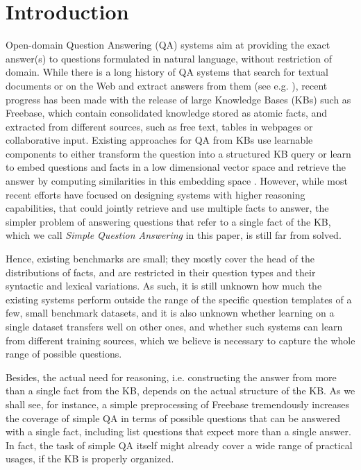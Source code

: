 \documentclass[11pt,a4paper]{article}
\newcommand{\fb}{{\sf Freebase}\xspace}
\begin{document}
\section{Introduction}

Open-domain Question Answering (QA) systems aim at providing the exact
answer(s) to questions formulated in natural language, without
restriction of domain. While there is a long history of QA systems
that search for textual documents or on the Web and extract answers
from them (see e.g. \cite{voorhees2000overview,dumais2002web}), recent
progress has been made with the release of large Knowledge Bases (KBs)
such as \fb, which contain consolidated knowledge stored as atomic
facts, and extracted from different sources, such as free text, tables
in webpages or collaborative input.
Existing approaches for QA from KBs use learnable components to either
transform the question into a structured KB query
\cite{berant-EtAl:2013:EMNLP} or learn to embed questions and facts in
a low dimensional vector space and retrieve the answer by computing
similarities in this embedding space
\cite{bordes-chopra-weston:2014:EMNLP2014}. However, while most recent
efforts have focused on designing systems with higher reasoning
capabilities, that could jointly retrieve and use multiple facts to
answer, the simpler problem of answering questions that refer to a
single fact of the KB, which we call {\it Simple Question Answering}
in this paper, is still far from solved.

Hence, existing benchmarks are small; they mostly cover the
head of the distributions of facts, and are restricted in their
question types and their syntactic and lexical variations. As such, it
is still unknown how much the existing systems perform outside the
range of the specific question templates of a few, small benchmark
datasets, and it is also unknown whether learning on a single dataset
transfers well on other ones, and whether such systems can learn from
different training sources, which we believe is necessary to capture
the whole range of possible questions.

Besides, the actual need for reasoning, i.e. constructing the answer
from more than a single fact from the KB, depends on the actual
structure of the KB. As we shall see, for instance, a simple
preprocessing of \fb tremendously increases the coverage of simple QA
in terms of possible questions that can be answered with a single
fact, including list questions that expect more than a single answer. In
fact, the task of simple QA itself might already cover a wide range of
practical usages, if the KB is properly organized.
\end{document}
